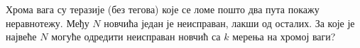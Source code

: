 \problem
Хрома вага су теразије (без тегова) које се ломе пошто два пута покажу
неравнотежу.
Међу $N$ новчића један је неисправан, лакши од осталих.
За које је највеће $N$ могуће одредити неисправан новчић са $k$ мерења на
хромој ваги?

\solution

\endproblem
